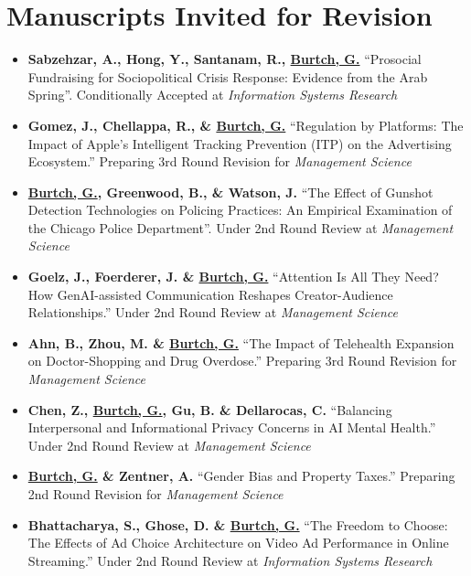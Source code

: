 \documentclass[10.5pt,letterpaper,sans]{moderncv}        %
\begin{document}
\section{Manuscripts Invited for Revision}

\begin{itemize}[leftmargin=!,labelindent=5pt,itemindent=-15pt]

\item \textbf{Sabzehzar, A., Hong, Y., Santanam, R., \underline{Burtch, G.}} ``Prosocial Fundraising for Sociopolitical Crisis Response: Evidence from the Arab Spring''. Conditionally Accepted at \textit{Information Systems Research}

\item \textbf{Gomez, J., Chellappa, R., \& \underline{Burtch, G.}} ``Regulation by Platforms: The Impact of Apple's Intelligent Tracking Prevention (ITP) on the Advertising Ecosystem.'' Preparing 3rd Round Revision for \textit{Management Science}

\item \textbf{\underline{Burtch, G.}, Greenwood, B., \& Watson, J.} ``The Effect of Gunshot Detection Technologies on Policing Practices: An Empirical Examination of the Chicago Police Department''. Under 2nd Round Review at \textit{Management Science}

\item \textbf{Goelz, J., Foerderer, J. \& \underline{Burtch, G.}} ``Attention Is All They Need? How GenAI-assisted Communication Reshapes Creator-Audience Relationships.'' Under 2nd Round Review at \textit{Management Science}

\item \textbf{Ahn, B., Zhou, M. \& \underline{Burtch, G.}} ``The Impact of Telehealth Expansion on Doctor-Shopping and Drug Overdose.'' Preparing 3rd Round Revision for \textit{Management Science}

\item \textbf{Chen, Z., \underline{Burtch, G.}, Gu, B. \& Dellarocas, C.} ``Balancing Interpersonal and Informational Privacy Concerns in AI Mental Health.'' Under 2nd Round Review at \textit{Management Science}

\item \textbf{\underline{Burtch, G.} \& Zentner, A.} ``Gender Bias and Property Taxes.'' Preparing 2nd Round Revision for \textit{Management Science}

\item \textbf{Bhattacharya, S., Ghose, D. \& \underline{Burtch, G.}} ``The Freedom to Choose: The Effects of Ad Choice Architecture on Video Ad Performance in Online Streaming.'' Under 2nd Round Review at \textit{Information Systems Research}

\end{itemize}
\end{document}
